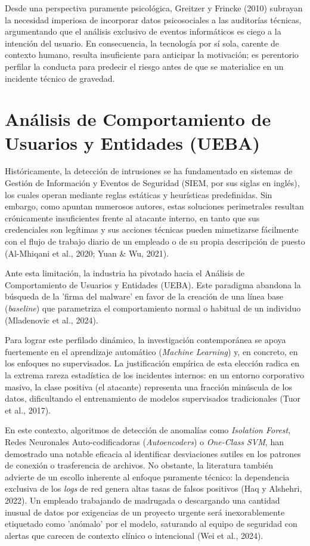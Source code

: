 \documentclass[IB]{TFUOC}%
\begin{document}
\medskip
\noindent Desde una perspectiva puramente psicológica, Greitzer y Frincke (2010) subrayan la necesidad imperiosa de incorporar datos psicosociales a las auditorías técnicas, argumentando que el análisis exclusivo de eventos informáticos es ciego a la intención del usuario. En consecuencia, la tecnología por sí sola, carente de contexto humano, resulta insuficiente para anticipar la motivación; es perentorio perfilar la conducta para predecir el riesgo antes de que se materialice en un incidente técnico de gravedad.


\section{Análisis de Comportamiento de Usuarios y Entidades (UEBA)}

Históricamente, la detección de intrusiones se ha fundamentado en sistemas de Gestión de Información y Eventos de Seguridad (SIEM, por sus siglas en inglés), los cuales operan mediante reglas estáticas y heurísticas predefinidas. Sin embargo, como apuntan numerosos autores, estas soluciones perimetrales resultan crónicamente insuficientes frente al atacante interno, en tanto que sus credenciales son legítimas y sus acciones técnicas pueden mimetizarse fácilmente con el flujo de trabajo diario de un empleado o de su propia descripción de puesto (Al-Mhiqani et al., 2020; Yuan \& Wu, 2021).

\medskip
\noindent Ante esta limitación, la industria ha pivotado hacia el Análisis de Comportamiento de Usuarios y Entidades (UEBA). Este paradigma abandona la búsqueda de la 'firma del malware' en favor de la creación de una línea base (\textit{baseline}) que parametriza el comportamiento normal o habitual de un individuo (Mladenovic et al., 2024). 

\medskip
\noindent Para lograr este perfilado dinámico, la investigación contemporánea se apoya fuertemente en el aprendizaje automático (\textit{Machine Learning}) y, en concreto, en los enfoques no supervisados. La justificación empírica de esta elección radica en la extrema rareza estadística de los incidentes internos: en un entorno corporativo masivo, la clase positiva (el atacante) representa una fracción minúscula de los datos, dificultando el entrenamiento de modelos supervisados tradicionales (Tuor et al., 2017). 

\medskip
\noindent En este contexto, algoritmos de detección de anomalías como \textit{Isolation Forest}, Redes Neuronales Auto-codificadoras (\textit{Autoencoders}) o \textit{One-Class SVM}, han demostrado una notable eficacia al identificar desviaciones sutiles en los patrones de conexión o trasferencia de archivos. No obstante, la literatura también advierte de un escollo inherente al enfoque puramente técnico: la dependencia exclusiva de los \textit{logs} de red genera altas tasas de falsos positivos (Haq y Alshehri, 2022). Un empleado trabajando de madrugada o descargando una cantidad inusual de datos por exigencias de un proyecto urgente será inexorablemente etiquetado como 'anómalo' por el modelo, saturando al equipo de seguridad con alertas que carecen de contexto clínico o intencional (Wei et al., 2024). 
\end{document}
